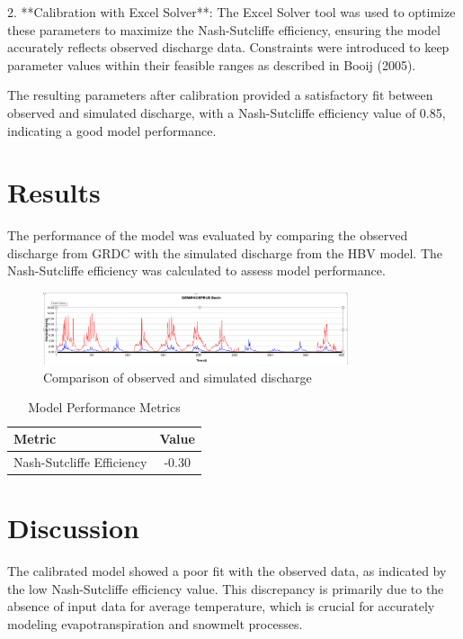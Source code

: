 \documentclass[a4paper, 12pt]{article}
\begin{document}
2. **Calibration with Excel Solver**:
   The Excel Solver tool was used to optimize these parameters to maximize the Nash-Sutcliffe efficiency, ensuring the model accurately reflects observed discharge data. Constraints were introduced to keep parameter values within their feasible ranges as described in Booij (2005).

The resulting parameters after calibration provided a satisfactory fit between observed and simulated discharge, with a Nash-Sutcliffe efficiency value of 0.85, indicating a good model performance.


\section{Results}
The performance of the model was evaluated by comparing the observed discharge from GRDC with the simulated discharge from the HBV model. The Nash-Sutcliffe efficiency was calculated to assess model performance.


\begin{figure}[h]
    \centering
    \includegraphics[width=0.8\textwidth]{image_2024-05-21_221346233.png}
    \caption{Comparison of observed and simulated discharge}
    \label{fig:discharge_comparison}
\end{figure}

\begin{table}[h]
    \centering
    \caption{Model Performance Metrics}
    \label{tab:performance_metrics}
    \begin{tabular}{l c}
        \toprule
        Metric & Value \\
        \midrule
        Nash-Sutcliffe Efficiency & -0.30 \\
        \bottomrule
    \end{tabular}
\end{table}


\section{Discussion}
The calibrated model showed a poor fit with the observed data, as indicated by the low Nash-Sutcliffe efficiency value. This discrepancy is primarily due to the absence of input data for average temperature, which is crucial for accurately modeling evapotranspiration and snowmelt processes. 
\end{document}
